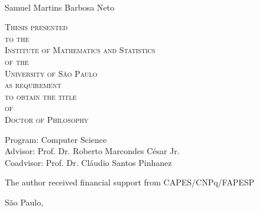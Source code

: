 \documentclass[11pt,twoside,a4paper]{book}
\begin{document}
\hypersetup{pageanchor=false}
\frontmatter
\fancyhead[RO]{{\footnotesize\rightmark}\hspace{2em}\thepage}
\setcounter{tocdepth}{2}
\fancyhead[LE]{\thepage\hspace{2em}\footnotesize{\leftmark}}
\fancyhead[RE,LO]{}
\fancyhead[RO]{{\footnotesize\rightmark}\hspace{2em}\thepage}

\onehalfspacing  %

\thispagestyle{empty}
\begin{center}
    \vspace*{2.3cm}
    \textbf{\Large{\phdTitle}}\\
    
    \vspace*{1.2cm}
    \Large{Samuel Martins Barbosa Neto}
    
    \vskip 2cm
    \textsc{
    Thesis presented\\[-0.25cm] 
    to the\\[-0.25cm]
    Institute of Mathematics and Statistics\\[-0.25cm]
    of the\\[-0.25cm]
    University of São Paulo\\[-0.25cm]
    as requirement\\[-0.25cm]
    to obtain the title\\[-0.25cm]
    of\\[-0.25cm]
    Doctor of Philosophy}
    
    \vskip 1.5cm
    Program: Computer Science\\
    Advisor: Prof. Dr. Roberto Marcondes César Jr.\\
    Coadvisor: Prof. Dr. Cláudio Santos Pinhanez

       \vskip 1cm
    \normalsize{The author received financial support from CAPES/CNPq/FAPESP}
    
    \vskip 0.5cm
    \normalsize{São Paulo, \thesisMonth \thesisYear}
\end{center}

%
%
%
\newpage
\thispagestyle{empty}
    \begin{center}
        \vspace*{2.3 cm}
        \textbf{\Large{\phdTitle}}\\
        \vspace*{2 cm}
    \end{center}
\end{document}
